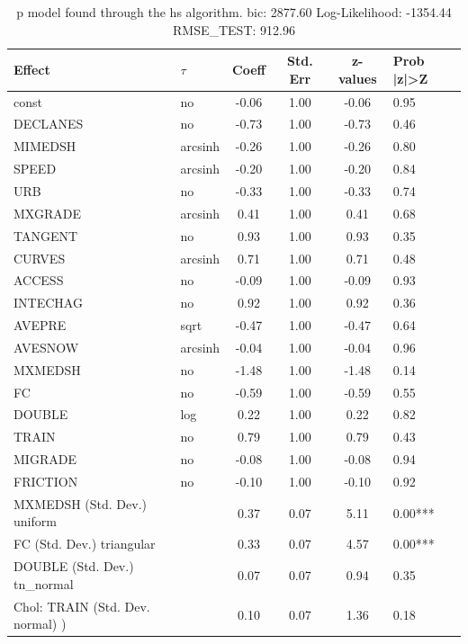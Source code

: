 \begin{table}
	\caption{p model found through the hs algorithm. bic: 2877.60 Log-Likelihood: -1354.44 RMSE_TEST: 912.96}
	\begin{center}
		\begin{tabular}{|l|l|c|c|c|l|}
			\hline
			Effect & $\tau$ & Coeff & Std. Err & z-values & Prob |z|>Z \\
			\hline
			const & no & -0.06 & 1.00 & -0.06 & 0.95 \\
			\hline
			DECLANES & no & -0.73 & 1.00 & -0.73 & 0.46 \\
			\hline
			MIMEDSH & arcsinh & -0.26 & 1.00 & -0.26 & 0.80 \\
			\hline
			SPEED & arcsinh & -0.20 & 1.00 & -0.20 & 0.84 \\
			\hline
			URB & no & -0.33 & 1.00 & -0.33 & 0.74 \\
			\hline
			MXGRADE & arcsinh & 0.41 & 1.00 & 0.41 & 0.68 \\
			\hline
			TANGENT & no & 0.93 & 1.00 & 0.93 & 0.35 \\
			\hline
			CURVES & arcsinh & 0.71 & 1.00 & 0.71 & 0.48 \\
			\hline
			ACCESS & no & -0.09 & 1.00 & -0.09 & 0.93 \\
			\hline
			INTECHAG & no & 0.92 & 1.00 & 0.92 & 0.36 \\
			\hline
			AVEPRE & sqrt & -0.47 & 1.00 & -0.47 & 0.64 \\
			\hline
			AVESNOW & arcsinh & -0.04 & 1.00 & -0.04 & 0.96 \\
			\hline
			MXMEDSH & no & -1.48 & 1.00 & -1.48 & 0.14 \\
			\hline
			FC & no & -0.59 & 1.00 & -0.59 & 0.55 \\
			\hline
			DOUBLE & log & 0.22 & 1.00 & 0.22 & 0.82 \\
			\hline
			TRAIN & no & 0.79 & 1.00 & 0.79 & 0.43 \\
			\hline
			MIGRADE & no & -0.08 & 1.00 & -0.08 & 0.94 \\
			\hline
			FRICTION & no & -0.10 & 1.00 & -0.10 & 0.92 \\
			\hline
			MXMEDSH (Std. Dev.) uniform &  & 0.37 & 0.07 & 5.11 & 0.00*** \\
			\hline
			FC (Std. Dev.) triangular &  & 0.33 & 0.07 & 4.57 & 0.00*** \\
			\hline
			DOUBLE (Std. Dev.) tn_normal &  & 0.07 & 0.07 & 0.94 & 0.35 \\
			\hline
			 Chol: TRAIN (Std. Dev. normal) ) &  & 0.10 & 0.07 & 1.36 & 0.18 \\

\end{tabular}
\end{center}
\end{table}
